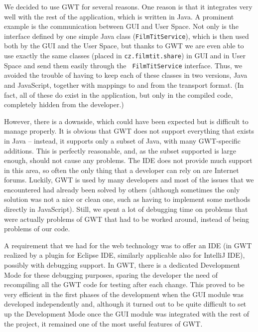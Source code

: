 
We decided to use GWT for several reasons.
One reason is that it integrates very well with the rest of the 
application, which is written in Java. A prominent example is the 
communication between GUI and User Space. Not only is the interface 
defined by one simple Java class ({\tt FilmTitService}), which is then 
used both by the GUI and the User Space, but thanks to GWT we are even 
able to use exactly the same classes (placed in {\tt cz.filmtit.share}) 
in GUI and in User Space and send them easily through the {\tt 
FilmTitService} interface. Thus, we avoided the trouble of having to keep 
each of these classes in two versions, Java and JavaScript, together with 
mappings to and from the transport format. (In fact, all of these do 
exist in the application, but only in the compiled code, completely 
hidden from the developer.)

However, there is a downside, which could have been expected but is 
difficult to manage properly. It is obvious that GWT does not support 
everything that exists in Java -- instead, it supports only a subset of 
Java, with many GWT-specific additions. This is perfectly reasonable, 
and, as the subset supported is large enough, should not cause any 
problems. The IDE does not provide much support in this area, so often the only thing 
that a developer can rely on are Internet forums. Luckily, GWT is used by 
many developers and most of the issues that we encountered had already 
been solved by others (although sometimes the only solution was not a 
nice or clean one, such as having to implement some methods directly in 
JavaScript). Still, we spent a lot of debugging time on problems that were actually problems of GWT that had to be worked around, instead of being problems of our code.

A requirement that we had for the web technology was to offer an IDE (in GWT realized by a plugin for Eclipse IDE, similarly applicable also for IntelliJ IDE), possibly with debugging support. In GWT, there is a dedicated Development Mode for these debugging purposes, sparing the developer the need of recompiling all the GWT code for testing after each change. This proved to be very efficient in the first phases of the development when the GUI module was developed independently and, although it turned out to be quite difficult to set up the Development Mode once the GUI module was integrated with the rest of the project, it remained one of the most useful features of GWT.

